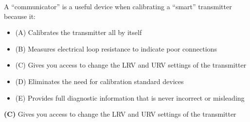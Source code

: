 

A ``communicator'' is a useful device when calibrating a ``smart'' transmitter because it:

\begin{itemize}
\item{(A)} Calibrates the transmitter all by itself
\vskip 5pt 
\item{(B)} Measures electrical loop resistance to indicate poor connections
\vskip 5pt 
\item{(C)} Gives you access to change the LRV and URV settings of the transmitter
\vskip 5pt 
\item{(D)} Eliminates the need for calibration standard devices
\vskip 5pt 
\item{(E)} Provides full diagnostic information that is never incorrect or misleading
\end{itemize}







{\bf (C)} Gives you access to change the LRV and URV settings of the transmitter
 









